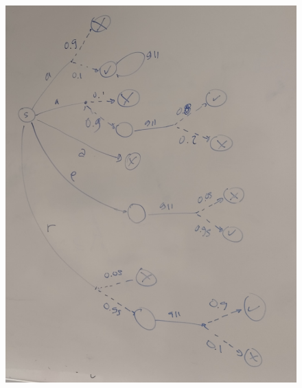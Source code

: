     \begin{figure}[t]
        \begin{center}
            \includegraphics[scale=0.1]{PLTS.jpg}
        \end{center}
    \end{figure}

